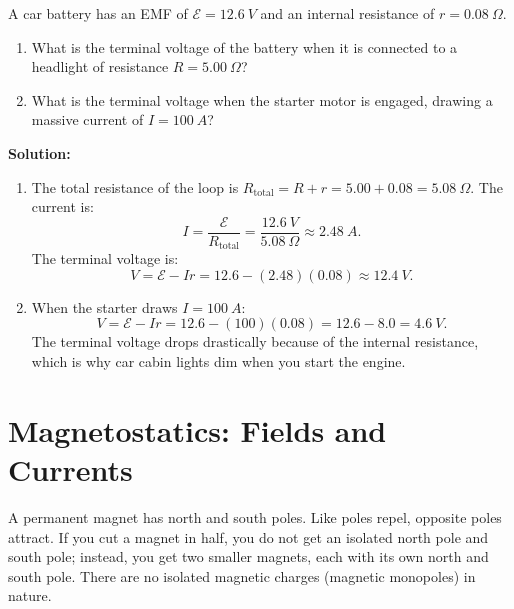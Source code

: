 \begin{workedexample}
A car battery has an EMF of $\mathcal{E} = \SI{12.6}{V}$ and an internal resistance of $r = \SI{0.08}{\Omega}$.
\begin{enumerate}[label=(\alph*), itemsep=1pt]
  \item What is the terminal voltage of the battery when it is connected to a headlight of resistance $R = \SI{5.00}{\Omega}$?
  \item What is the terminal voltage when the starter motor is engaged, drawing a massive current of $I = \SI{100}{A}$?
\end{enumerate}
\textbf{Solution:}
\begin{enumerate}[label=(\alph*)]
  \item The total resistance of the loop is $R_{\text{total}} = R + r = 5.00 + 0.08 = \SI{5.08}{\Omega}$. The current is:
        \begin{equation*}
            I = \frac{\mathcal{E}}{R_{\text{total}}} = \frac{\SI{12.6}{V}}{\SI{5.08}{\Omega}} \approx \SI{2.48}{A}.
        \end{equation*}
        The terminal voltage is:
        \begin{equation*}
            V = \mathcal{E} - I r = 12.6 - (2.48)(0.08) \approx \SI{12.4}{V}.
        \end{equation*}
  \item When the starter draws $I = \SI{100}{A}$:
        \begin{equation*}
            V = \mathcal{E} - I r = 12.6 - (100)(0.08) = 12.6 - 8.0 = \SI{4.6}{V}.
        \end{equation*}
        The terminal voltage drops drastically because of the internal resistance, which is why car cabin lights dim when you start the engine.
\end{enumerate}
\end{workedexample}

\section{Magnetostatics: Fields and Currents}

A permanent magnet has north and south poles. Like poles repel, opposite poles attract. If you cut a magnet in half, you do not get an isolated north pole and south pole; instead, you get two smaller magnets, each with its own north and south pole. There are no isolated magnetic charges (magnetic monopoles) in nature.

